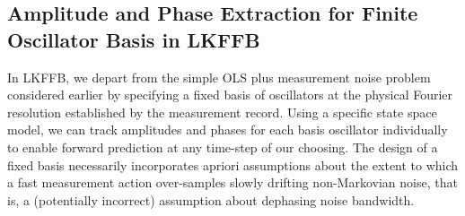 \subsection{Amplitude and Phase Extraction for Finite Oscillator Basis in LKFFB \label{sec:app:subsec:LKFFB}}
 In LKFFB, we depart from the simple OLS plus measurement noise problem considered earlier by specifying a fixed basis of oscillators at the physical Fourier resolution established by the measurement record. Using a specific state space model, we can track amplitudes and phases for each basis oscillator individually to enable forward prediction at any time-step of our choosing. The design of a fixed basis necessarily incorporates apriori assumptions about the extent to which a fast measurement action over-samples slowly drifting non-Markovian noise, that is, a (potentially incorrect) assumption about dephasing noise bandwidth.
 
